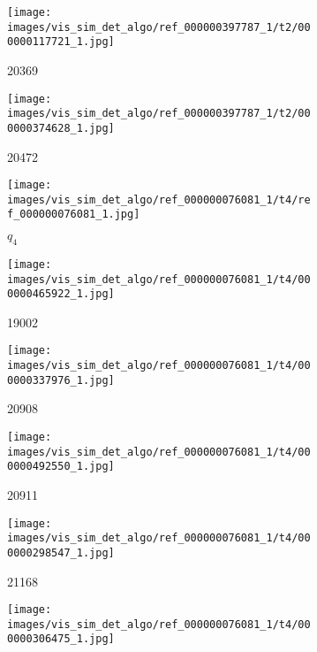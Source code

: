 \begin{figure}[h!]
\begin{subfigure}[b]{0.09\textwidth}
         \centering
         \texttt{[image: images/vis\_sim\_det\_algo/ref\_000000397787\_1/t2/000000117721\_1.jpg]}
         \caption*{20369}                  
         \label{fig:vis_sim_img_ex_3_9}
     \end{subfigure}  
     \hfill
     \begin{subfigure}[b]{0.09\textwidth}
         \centering
         \texttt{[image: images/vis\_sim\_det\_algo/ref\_000000397787\_1/t2/000000374628\_1.jpg]}
         \caption*{20472}
         \label{fig:vis_sim_img_ex_3_10}
     \end{subfigure}  
    \begin{subfigure}[b]{0.09\textwidth}
         \centering
         \texttt{[image: images/vis\_sim\_det\_algo/ref\_000000076081\_1/t4/ref\_000000076081\_1.jpg]}
         \caption*{$q_4$}
         \label{fig:vis_sim_img_ex_4_1}
     \end{subfigure}  
     \begin{subfigure}[b]{0.09\textwidth}
         \centering
         \texttt{[image: images/vis\_sim\_det\_algo/ref\_000000076081\_1/t4/000000465922\_1.jpg]}
         \caption*{19002}
         \label{fig:vis_sim_img_ex_4_2}
     \end{subfigure}  
     \hfill
     \begin{subfigure}[b]{0.09\textwidth}
         \centering
         \texttt{[image: images/vis\_sim\_det\_algo/ref\_000000076081\_1/t4/000000337976\_1.jpg]}
         \caption*{20908}
         \label{fig:vis_sim_img_ex_4_3}
     \end{subfigure}  
     \hfill
     \begin{subfigure}[b]{0.09\textwidth}
         \centering
         \texttt{[image: images/vis\_sim\_det\_algo/ref\_000000076081\_1/t4/000000492550\_1.jpg]}
         \caption*{20911}         
         \label{fig:vis_sim_img_ex_4_4}
     \end{subfigure}  
     \hfill
     \begin{subfigure}[b]{0.09\textwidth}
         \centering
         \texttt{[image: images/vis\_sim\_det\_algo/ref\_000000076081\_1/t4/000000298547\_1.jpg]}
         \caption*{21168}         
         \label{fig:vis_sim_img_ex_4_5}
     \end{subfigure}  
     \hfill
     \begin{subfigure}[b]{0.09\textwidth}
         \centering
         \texttt{[image: images/vis\_sim\_det\_algo/ref\_000000076081\_1/t4/000000306475\_1.jpg]}

\end{subfigure}
\end{figure}
